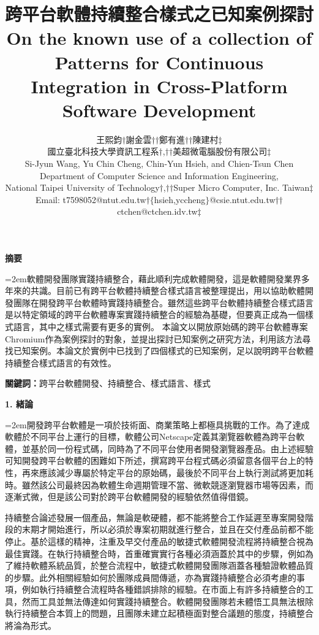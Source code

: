 \documentclass[10pt, twocolumn]{article}
\title{\fontsize{14pt}{14pt}\textbf{跨平台軟體持續整合樣式之已知案例探討\\On the known use of a collection of Patterns for Continuous Integration in Cross-Platform Software Development}}
\author{\fontsize{12pt}{12pt}王熙鈞$\dagger$\hspace{3em}謝金雲$\dagger$$\dagger$\hspace{3em}鄭有進$\dagger$$\dagger$\hspace{3em}陳建村$\ddag$\\國立臺北科技大學資訊工程系$\dagger$,$\dagger$$\dagger$\hspace{1em}美超微電腦股份有限公司$\ddag$\\Si-Jyun Wang, Yu Chin Cheng, Chin-Yun Hsieh, and Chien-Tsun Chen\\Department of Computer Science and Information Engineering, \\National Taipei University of Technology$\dagger$,$\dagger$$\dagger$\hspace{1em}Super Micro Computer, Inc. Taiwan$\ddag$\\Email: t7598052@ntut.edu.tw$\dagger$\hspace{1em}$\{$hsieh,yccheng$\}$@csie.ntut.edu.tw$\dagger$$\dagger$\hspace{1em}ctchen@ctchen.idv.tw$\ddag$}
\date{}
\begin{document}
\maketitle
\thispagestyle{empty}



\begin{center}\textbf{摘要}\end{center}

\parindent=2em軟體開發團隊實踐持續整合，藉此順利完成軟體開發，這是軟體開發業界多年來的共識。目前已有跨平台軟體持續整合樣式語言被整理提出，用以協助軟體開發團隊在開發跨平台軟體時實踐持續整合。雖然這些跨平台軟體持續整合樣式語言是以特定領域的跨平台軟體專案實踐持續整合的經驗為基礎，但要真正成為一個樣式語言，其中之樣式需要有更多的實例。
本論文以開放原始碼的跨平台軟體專案\textendash\hspace{4pt}Chromium作為案例探討的對象，並提出探討已知案例之研究方法，利用該方法尋找已知案例。本論文於實例中已找到了四個樣式的已知案例，足以說明跨平台軟體持續整合樣式語言的有效性。

\textbf{關鍵詞：}\fontsize{9pt}{9pt}\selectfont 跨平台軟體開發、持續整合、樣式語言、樣式
\fontsize{10pt}{12pt}\selectfont

\begin{raggedright}\textbf{1. 緒論}\end{raggedright}

\parindent=2em開發跨平台軟體是一項於技術面、商業策略上都極具挑戰的工作。為了達成軟體於不同平台上運行的目標，軟體公司Netscape定義其瀏覽器軟體為跨平台軟體，並基於同一份程式碼，同時為了不同平台使用者開發瀏覽器產品。由上述經驗可知開發跨平台軟體的困難如下所述，撰寫跨平台程式碼必須留意各個平台上的特性，再來應該減少專屬於特定平台的原始碼，最後於不同平台上執行測試將更加耗時\cite{netscapecrossplatform}。雖然該公司最終因為軟體生命週期管理不當、微軟競逐瀏覽器市場等因素，而逐漸式微，但是該公司對於跨平台軟體開發的經驗依然值得借鏡。

持續整合論述發展一個產品，無論是軟硬體，都不能將整合工作延遲至專案開發階段的末期才開始進行，所以必須於專案初期就進行整合，並且在交付產品前都不能停止。基於這樣的精神，注重及早交付產品的敏捷式軟體開發流程將持續整合視為最佳實踐。在執行持續整合時，首重確實實行各種必須涵蓋於其中的步驟，例如為了維持軟體系統品質，於整合流程中，敏捷式軟體開發團隊涵蓋各種驗證軟體品質的步驟。此外相關經驗如何於團隊成員間傳遞，亦為實踐持續整合必須考慮的事項，例如執行持續整合流程時各種錯誤排除的經驗。在市面上有許多持續整合的工具，然而工具並無法傳達如何實踐持續整合。軟體開發團隊若未體悟工具無法根除執行持續整合本質上的問題，且團隊未建立起積極面對整合議題的態度，持續整合將淪為形式。
\end{document}
